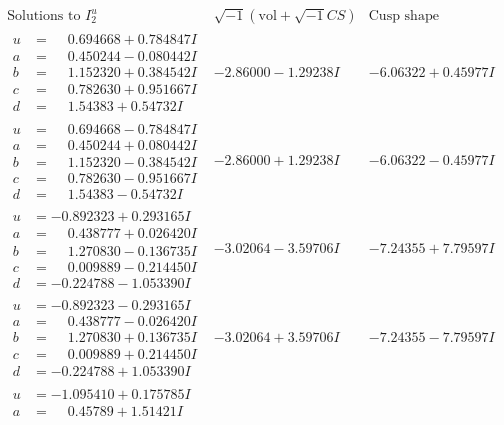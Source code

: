 \documentclass[1p]{elsarticle_modified}
\theoremstyle{definition}
\newcommand{\I}{\sqrt{-1}}
\begin{document}
$$\begin{array}{c|c|c}  
\text{Solutions to }I^u_{2}& \I (\text{vol} + \sqrt{-1}CS) & \text{Cusp shape}\\
 \hline 
\begin{aligned}
u &= \phantom{-}0.694668 + 0.784847 I \\
a &= \phantom{-}0.450244 - 0.080442 I \\
b &= \phantom{-}1.152320 + 0.384542 I \\
c &= \phantom{-}0.782630 + 0.951667 I \\
d &= \phantom{-}1.54383 + 0.54732 I\end{aligned}
 & -2.86000 - 1.29238 I & -6.06322 + 0.45977 I \\ \hline\begin{aligned}
u &= \phantom{-}0.694668 - 0.784847 I \\
a &= \phantom{-}0.450244 + 0.080442 I \\
b &= \phantom{-}1.152320 - 0.384542 I \\
c &= \phantom{-}0.782630 - 0.951667 I \\
d &= \phantom{-}1.54383 - 0.54732 I\end{aligned}
 & -2.86000 + 1.29238 I & -6.06322 - 0.45977 I \\ \hline\begin{aligned}
u &= -0.892323 + 0.293165 I \\
a &= \phantom{-}0.438777 + 0.026420 I \\
b &= \phantom{-}1.270830 - 0.136735 I \\
c &= \phantom{-}0.009889 - 0.214450 I \\
d &= -0.224788 - 1.053390 I\end{aligned}
 & -3.02064 - 3.59706 I & -7.24355 + 7.79597 I \\ \hline\begin{aligned}
u &= -0.892323 - 0.293165 I \\
a &= \phantom{-}0.438777 - 0.026420 I \\
b &= \phantom{-}1.270830 + 0.136735 I \\
c &= \phantom{-}0.009889 + 0.214450 I \\
d &= -0.224788 + 1.053390 I\end{aligned}
 & -3.02064 + 3.59706 I & -7.24355 - 7.79597 I \\ \hline\begin{aligned}
u &= -1.095410 + 0.175785 I \\
a &= \phantom{-}0.45789 + 1.51421 I \\

\end{aligned}
\end{array}$$
\end{document}
